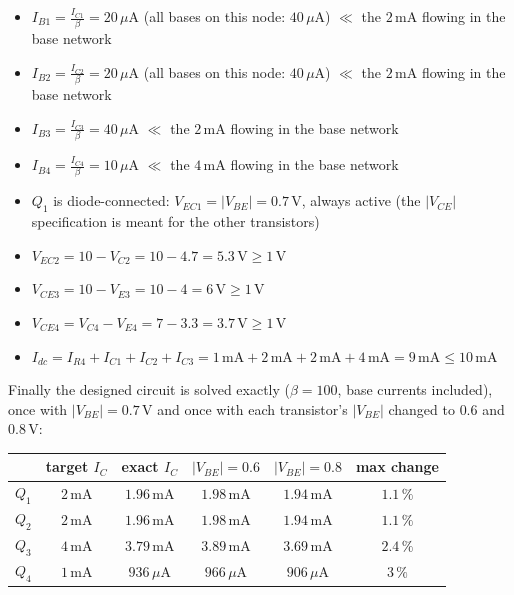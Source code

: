 \documentclass[11pt]{article}
\newcommand{\solstep}[2]{\par\medskip{\color{stepc}\textbf{Step #1 --- #2}}\par\nopagebreak}
\begin{document}
\solstep{4}{Check the design}\begin{itemize}[leftmargin=*,itemsep=2pt]
\item $I_{B1} = \frac{I_{C1}}{\beta} = 20\,\mu \mathrm{A}$ (all bases on this node: $40\,\mu \mathrm{A}$) $\ll$ the $2\,\mathrm{m}\mathrm{A}$ flowing in the base network \checkmark
\item $I_{B2} = \frac{I_{C2}}{\beta} = 20\,\mu \mathrm{A}$ (all bases on this node: $40\,\mu \mathrm{A}$) $\ll$ the $2\,\mathrm{m}\mathrm{A}$ flowing in the base network \checkmark
\item $I_{B3} = \frac{I_{C3}}{\beta} = 40\,\mu \mathrm{A}$ $\ll$ the $2\,\mathrm{m}\mathrm{A}$ flowing in the base network \checkmark
\item $I_{B4} = \frac{I_{C4}}{\beta} = 10\,\mu \mathrm{A}$ $\ll$ the $4\,\mathrm{m}\mathrm{A}$ flowing in the base network \checkmark
\item $Q_{1}$ is diode-connected: $V_{EC1} = |V_{BE}| = 0.7$\,V, always active (the $|V_{CE}|$ specification is meant for the other transistors) \checkmark
\item $V_{EC2} = 10 - V_{C2} = 10 - 4.7 = 5.3\,\mathrm{V} \ge 1$\,V \checkmark
\item $V_{CE3} = 10 - V_{E3} = 10 - 4 = 6\,\mathrm{V} \ge 1$\,V \checkmark
\item $V_{CE4} = V_{C4} - V_{E4} = 7 - 3.3 = 3.7\,\mathrm{V} \ge 1$\,V \checkmark
\item $I_{dc} = I_{R4} + I_{C1} + I_{C2} + I_{C3} = 1\,\mathrm{m}\mathrm{A} + 2\,\mathrm{m}\mathrm{A} + 2\,\mathrm{m}\mathrm{A} + 4\,\mathrm{m}\mathrm{A} = 9\,\mathrm{m}\mathrm{A} \le 10\,\mathrm{m}\mathrm{A}$ \checkmark
\end{itemize}
Finally the designed circuit is solved exactly ($\beta=100$, base currents included), once with $|V_{BE}|=0.7$\,V and once with each transistor's $|V_{BE}|$ changed to $0.6$ and $0.8$\,V:\begin{center}\renewcommand{\arraystretch}{1.35}
\begin{tabular}{cccccc}
\toprule
 & target $I_C$ & exact $I_C$ & $|V_{BE}|=0.6$ & $|V_{BE}|=0.8$ & max change \\
\midrule
$Q_{1}$ & $2\,\mathrm{m}\mathrm{A}$ & $1.96\,\mathrm{m}\mathrm{A}$ & $1.98\,\mathrm{m}\mathrm{A}$ & $1.94\,\mathrm{m}\mathrm{A}$ & $1.1\,\%$ \\
$Q_{2}$ & $2\,\mathrm{m}\mathrm{A}$ & $1.96\,\mathrm{m}\mathrm{A}$ & $1.98\,\mathrm{m}\mathrm{A}$ & $1.94\,\mathrm{m}\mathrm{A}$ & $1.1\,\%$ \\
$Q_{3}$ & $4\,\mathrm{m}\mathrm{A}$ & $3.79\,\mathrm{m}\mathrm{A}$ & $3.89\,\mathrm{m}\mathrm{A}$ & $3.69\,\mathrm{m}\mathrm{A}$ & $2.4\,\%$ \\
$Q_{4}$ & $1\,\mathrm{m}\mathrm{A}$ & $936\,\mu \mathrm{A}$ & $966\,\mu \mathrm{A}$ & $906\,\mu \mathrm{A}$ & $3\,\%$ \\
\bottomrule
\end{tabular}\end{center}
\end{document}
